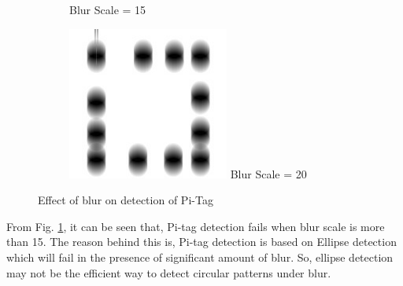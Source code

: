 \documentclass[runningheads]{llncs}
\begin{document}
\begin{figure}
\begin{subfigure}[b]{0.3\textwidth}
  Blur Scale = 15  
 \end{subfigure}
 \begin{subfigure}[b]{0.3\textwidth}
  \centering
  \includegraphics[width=\linewidth]{nodetect_blur20.jpg}
  Blur Scale = 20  
 \end{subfigure}
 \caption{Effect of blur on detection of Pi-Tag}
 \label{fig:pitag_blur}
\end{figure}

From Fig. \ref{fig:pitag_blur}, it can be seen that, Pi-tag detection
fails when blur scale is more than 15. The reason behind this is, Pi-tag
detection is based on Ellipse detection which will fail in the presence of
significant amount of blur. So, ellipse detection may not be the efficient way
to detect circular patterns under blur.
\end{document}
